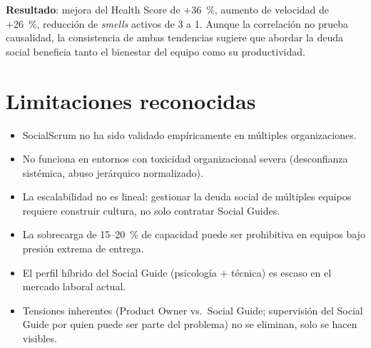 \textbf{Resultado}: mejora del Health Score de +36~\%, aumento de velocidad de +26~\%, reducción de \textit{smells} activos de 3 a 1. Aunque la correlación no prueba causalidad, la consistencia de ambas tendencias sugiere que abordar la deuda social beneficia tanto el bienestar del equipo como su productividad.

\section{Limitaciones reconocidas}

\begin{itemize}
    \item SocialScrum no ha sido validado empíricamente en múltiples organizaciones.
    \item No funciona en entornos con toxicidad organizacional severa (desconfianza sistémica, abuso jerárquico normalizado).
    \item La escalabilidad no es lineal: gestionar la deuda social de múltiples equipos requiere construir cultura, no solo contratar Social Guides.
    \item La sobrecarga de 15--20~\% de capacidad puede ser prohibitiva en equipos bajo presión extrema de entrega.
    \item El perfil híbrido del Social Guide (psicología + técnica) es escaso en el mercado laboral actual.
    \item Tensiones inherentes (Product Owner vs.\ Social Guide; supervisión del Social Guide por quien puede ser parte del problema) no se eliminan, solo se hacen visibles.
\end{itemize}
